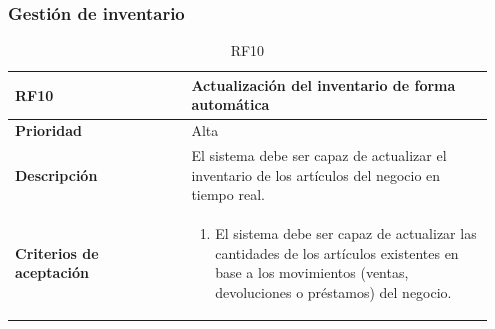 \clearpage

\subsubsection{Gestión de inventario}

\begin{table}[H]
	\centering %
	\begin{tabular}{|p{0.35\linewidth}|p{0.6\linewidth}|}
		\hline
		\rowcolor{grayshade} \textbf{RF10} & \textbf{Actualización del inventario de forma automática} \\
		\hline
		\textbf{Prioridad} & Alta \\
		\hline
		\textbf{Descripción} & El sistema debe ser capaz de actualizar el inventario de los artículos del negocio en tiempo real.\\
		\hline
		\vspace{0.5mm}
		\textbf{Criterios de aceptación} & 
		\begin{minipage}[t]{0.9\linewidth}
			\begin{enumerate}
				\item El sistema debe ser capaz de actualizar las cantidades de los artículos existentes en base a los movimientos (ventas, devoluciones o préstamos) del negocio. 
			\end{enumerate}
			\vspace{2mm}
		\end{minipage} \\
		\hline
	\end{tabular}
	\caption{RF10}
\end{table}

